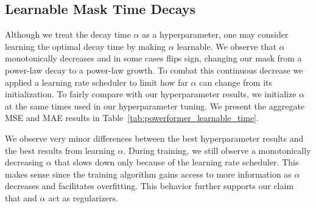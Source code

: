 \subsection{Learnable Mask Time Decays}
\label{sm:learnable_decay_times}

Although we treat the decay time $\alpha$ as a hyperparameter, one may consider learning the optimal decay time by making $\alpha$ learnable.
We observe that $\alpha$ monotonically decreases and in some cases flips sign, changing our mask from a power-law decay to a power-law growth.
To combat this continuous decrease we applied a learning rate scheduler to limit how far $\alpha$ can change from its initialization.
To fairly compare with our hyperparameter results, we initialize $\alpha$ at the same times used in our hyperparameter tuning.
We present the aggregate MSE and MAE results in Table~\ref{tab:powerformer_learnable_time}.

We observe very minor differences between the best hyperparameter results and the best results from learning $\alpha$.
During training, we still observe a monotonically decreasing $\alpha$ that slows down only because of the learning rate scheduler.
This makes sense since the training algorithm gains access to more information as $\alpha$ decreases and facilitates overfitting.
This behavior further supports our claim that \maskCL{} and $\alpha$ act as regularizers.

